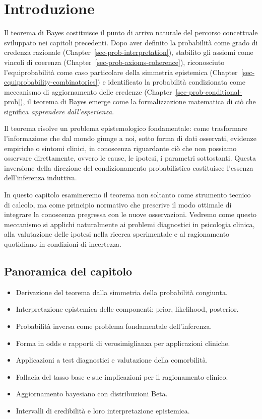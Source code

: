 \documentclass[
  letterpaper,
  DIV=11,
  numbers=noendperiod,
  oneside]{scrreprt}
\providecommand{\tightlist}{%
  \setlength{\itemsep}{0pt}\setlength{\parskip}{0pt}}
\theoremstyle{definition}
\theoremstyle{plain}
\theoremstyle{definition}
\theoremstyle{remark}
\begin{document}
\section*{Introduzione}\label{introduzione-5}


Il teorema di Bayes costituisce il punto di arrivo naturale del percorso
concettuale sviluppato nei capitoli precedenti. Dopo aver definito la
probabilità come grado di credenza razionale
(Chapter~\ref{sec-prob-interpretation}), stabilito gli assiomi come
vincoli di coerenza (Chapter~\ref{sec-prob-axioms-coherence}),
riconosciuto l'equiprobabilità come caso particolare della simmetria
epistemica (Chapter~\ref{sec-equiprobability-combinatorics}) e
identificato la probabilità condizionata come meccanismo di
aggiornamento delle credenze (Chapter~\ref{sec-prob-conditional-prob}),
il teorema di Bayes emerge come la formalizzazione matematica di ciò che
significa \emph{apprendere dall'esperienza}.

Il teorema risolve un problema epistemologico fondamentale: come
trasformare l'informazione che dal mondo giunge a noi, sotto forma di
dati osservati, evidenze empiriche o sintomi clinici, in conoscenza
riguardante ciò che non possiamo osservare direttamente, ovvero le
cause, le ipotesi, i parametri sottostanti. Questa inversione della
direzione del condizionamento probabilistico costituisce l'essenza
dell'inferenza induttiva.

In questo capitolo esamineremo il teorema non soltanto come strumento
tecnico di calcolo, ma come principio normativo che prescrive il modo
ottimale di integrare la conoscenza pregressa con le nuove osservazioni.
Vedremo come questo meccanismo si applichi naturalmente ai problemi
diagnostici in psicologia clinica, alla valutazione delle ipotesi nella
ricerca sperimentale e al ragionamento quotidiano in condizioni di
incertezza.

\subsection*{Panoramica del capitolo}\label{panoramica-del-capitolo-4}

\begin{itemize}
\tightlist
\item
  Derivazione del teorema dalla simmetria della probabilità congiunta.
\item
  Interpretazione epistemica delle componenti: prior, likelihood,
  posterior.
\item
  Probabilità inversa come problema fondamentale dell'inferenza.
\item
  Forma in odds e rapporti di verosimiglianza per applicazioni cliniche.
\item
  Applicazioni a test diagnostici e valutazione della comorbilità.
\item
  Fallacia del tasso base e sue implicazioni per il ragionamento
  clinico.
\item
  Aggiornamento bayesiano con distribuzioni Beta.
\item
  Intervalli di credibilità e loro interpretazione epistemica.
\end{itemize}
\end{document}
